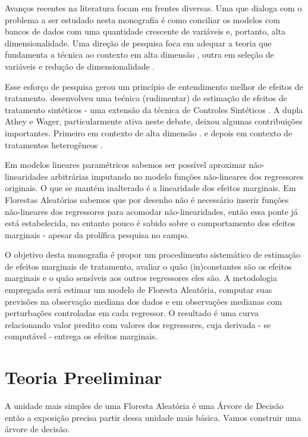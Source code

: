 Avanços recentes na literatura focam em frentes diversas. Uma que dialoga com o problema a ser estudado nesta monografia é como conciliar os modelos com bancos de dados com uma quantidade crescente de variáveis e, portanto, alta dimensionalidade. Uma direção de pesquisa foca em adequar a teoria que fundamenta a técnica ao contexto em alta dimensão \cite{athey2019generalized}, outra em seleção de variáveis e redução de dimensionalidade \cite{hastie2015statistical}. 

Esse esforço de pesquisa gerou um princípio de entendimento melhor de efeitos de tratamento.  desenvolveu uma tećnica (rudimentar) de estimação de efeitos de tratamento sintéticos - uma extensão da técnica de Controles Sintéticos \cite{abadie2010synthetic}. A dupla Athey e Wager, particularmente ativa neste debate, deixou algumas contribuições importantes. Primeiro em contexto de alta dimensão \cite{athey2018approximate}. e depois em contexto de tratamentos heterogêneos \cite{wager2018estimation}. 

Em modelos lineares paramétricos sabemos ser possível aproximar não-linearidades arbitrárias imputando no modelo funções não-lineares dos regressores originais. O que se mantém inalterado é a linearidade dos efeitos marginais. Em Florestas Aleatórias sabemos que por desenho não é necessário inserir funções não-lineares dos regressores para acomodar não-linearidades, então essa ponte já está estabelecida, no entanto pouco é sabido sobre o comportamento dos efeitos marginais - apesar da prolífica pesquisa no campo.

O objetivo desta monografia é propor um procedimento sistemático de estimação de efeitos marginais de tratamento, avaliar o quão (in)constantes são os efeitos marginais e o quão sensíveis aos outros regressores eles são. A metodologia empregada será estimar um modelo de Floresta Aleatória, computar suas previsões na observação mediana dos dados e em observações medianas com perturbações controladas em cada regressor. O resultado é uma curva relacionando valor predito com valores dos regressores, cuja derivada - se computável - entrega os efeitos marginais.

\section{Teoria Preeliminar}

A unidade mais simples de uma Floresta Aleatória é uma Árvore de Decisão \cite{breiman2017classification} então a exposição precisa partir dessa unidade mais básica. Vamos construir uma árvore de decisão.

